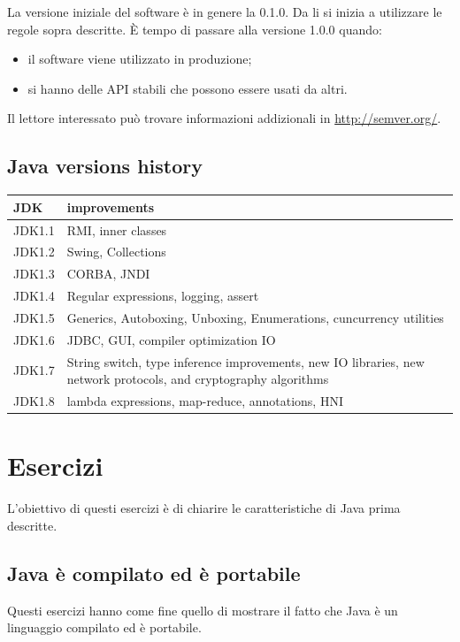 \documentclass{article}
\theoremstyle{definition}
\begin{document}
La versione iniziale del software \`e in genere la 0.1.0. Da li si inizia a utilizzare le regole sopra descritte.
\`E tempo di passare alla versione 1.0.0 quando:
\begin{itemize}
\item il software viene utilizzato in produzione;
\item si hanno delle API stabili che possono essere usati da altri.
\end{itemize}


Il lettore interessato pu\`o trovare informazioni addizionali in \url{http://semver.org/}.

\subsection{Java versions history}
\begin{table}[h]
\center
\begin{tabular}{ | p{1cm} | p{12cm} |}
\hline
JDK & improvements \\
\hline
JDK1.1 & RMI, inner classes \\
JDK1.2 & Swing, Collections \\
JDK1.3 & CORBA, JNDI \\
JDK1.4 & Regular expressions, logging, assert  \\
JDK1.5 & Generics, Autoboxing, Unboxing, Enumerations, cuncurrency utilities  \\
JDK1.6 & JDBC, GUI, compiler optimization IO \\
JDK1.7 & String switch, type inference improvements, new IO libraries, new network protocols, and cryptography algorithms  \\
JDK1.8 & lambda expressions,  map-reduce, annotations, HNI\\
\hline
\end{tabular}

\end{table}

\section{Esercizi}
L'obiettivo di questi esercizi \`e di chiarire le caratteristiche di Java prima descritte.

\subsection{Java \`e compilato ed \`e portabile}
Questi esercizi hanno come fine quello di mostrare il fatto che Java \`e un linguaggio compilato ed \`e portabile. 
\end{document}
